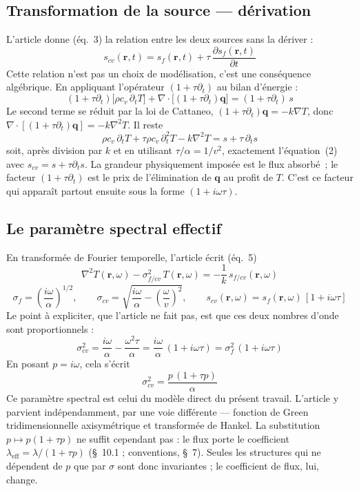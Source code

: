\documentclass[11pt,a4paper]{article}
\begin{document}
\subsection{Transformation de la source --- dérivation}

L'article donne (éq.~3) la relation entre les deux sources sans la dériver :
\[
s_{cv}(\mathbf r, t) = s_f(\mathbf r, t) + \tau\,\frac{\partial s_f(\mathbf r, t)}{\partial t}
\]
Cette relation n'est pas un choix de modélisation, c'est une conséquence algébrique. En
appliquant l'opérateur $(1 + \tau\partial_t)$ au bilan d'énergie :
\[
(1+\tau\partial_t)\big[\rho c_v\,\partial_t T\big]
+ \nabla\!\cdot\big[(1+\tau\partial_t)\mathbf q\big] = (1+\tau\partial_t)\,s
\]
Le second terme se réduit par la loi de Cattaneo, $(1+\tau\partial_t)\mathbf q = -k\nabla T$,
donc $\nabla\!\cdot[(1+\tau\partial_t)\mathbf q] = -k\nabla^2 T$. Il reste
\[
\rho c_v\,\partial_t T + \tau \rho c_v\,\partial_t^2 T - k\nabla^2 T = s + \tau\,\partial_t s
\]
soit, après division par $k$ et en utilisant $\tau/\alpha = 1/v^2$, exactement l'équation~(2)
avec $s_{cv} = s + \tau\partial_t s$. La grandeur physiquement imposée est le flux absorbé~; le
facteur $(1+\tau\partial_t)$ est le prix de l'élimination de $\mathbf q$ au profit de $T$. C'est
ce facteur qui apparaît partout ensuite sous la forme $(1+i\omega\tau)$.

\subsection{Le paramètre spectral effectif}

En transformée de Fourier temporelle, l'article écrit (éq.~5)
\[
\nabla^2 T(\mathbf r,\omega) - \sigma^2_{f/cv}\,T(\mathbf r,\omega)
= -\frac{1}{k}\,s_{f/cv}(\mathbf r,\omega)
\]
\[
\sigma_f = \left(\frac{i\omega}{\alpha}\right)^{1/2}, \qquad
\sigma_{cv} = \sqrt{\frac{i\omega}{\alpha} - \left(\frac{\omega}{v}\right)^{2}}, \qquad
s_{cv}(\mathbf r,\omega) = s_f(\mathbf r,\omega)\,[1+i\omega\tau]
\]
Le point à expliciter, que l'article ne fait pas, est que ces deux nombres d'onde sont
proportionnels :
\[
\sigma_{cv}^2 = \frac{i\omega}{\alpha} - \frac{\omega^2\tau}{\alpha}
= \frac{i\omega}{\alpha}\,(1 + i\omega\tau) = \sigma_f^2\,(1+i\omega\tau)
\]
En posant $p = i\omega$, cela s'écrit
\[
\sigma_{cv}^2 = \frac{p\,(1+\tau p)}{\alpha}
\]
Ce paramètre spectral est celui du modèle direct du présent travail. L'article y parvient
indépendamment, par une voie différente --- fonction de Green tridimensionnelle axisymétrique et
transformée de Hankel. La substitution $p \mapsto p(1+\tau p)$ ne suffit cependant pas : le flux
porte le coefficient $\lambda_{\mathrm{eff}}=\lambda/(1+\tau p)$ (§~10.1 ; conventions, §~7).
Seules les structures qui ne dépendent de $p$ que par $\sigma$ sont donc invariantes ; le
coefficient de flux, lui, change.
\end{document}
